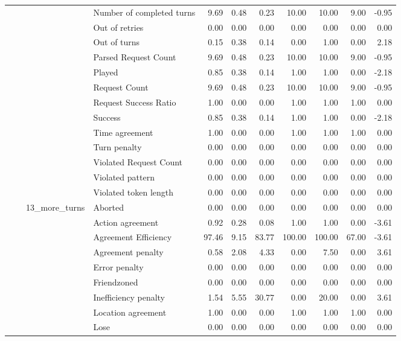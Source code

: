\begin{tabular}{llllrrrrrrr}
 &  &  & Number of completed turns & 9.69 & 0.48 & 0.23 & 10.00 & 10.00 & 9.00 & -0.95 \\
 &  &  & Out of retries & 0.00 & 0.00 & 0.00 & 0.00 & 0.00 & 0.00 & 0.00 \\
 &  &  & Out of turns & 0.15 & 0.38 & 0.14 & 0.00 & 1.00 & 0.00 & 2.18 \\
 &  &  & Parsed Request Count & 9.69 & 0.48 & 0.23 & 10.00 & 10.00 & 9.00 & -0.95 \\
 &  &  & Played & 0.85 & 0.38 & 0.14 & 1.00 & 1.00 & 0.00 & -2.18 \\
 &  &  & Request Count & 9.69 & 0.48 & 0.23 & 10.00 & 10.00 & 9.00 & -0.95 \\
 &  &  & Request Success Ratio & 1.00 & 0.00 & 0.00 & 1.00 & 1.00 & 1.00 & 0.00 \\
 &  &  & Success & 0.85 & 0.38 & 0.14 & 1.00 & 1.00 & 0.00 & -2.18 \\
 &  &  & Time agreement & 1.00 & 0.00 & 0.00 & 1.00 & 1.00 & 1.00 & 0.00 \\
 &  &  & Turn penalty & 0.00 & 0.00 & 0.00 & 0.00 & 0.00 & 0.00 & 0.00 \\
 &  &  & Violated Request Count & 0.00 & 0.00 & 0.00 & 0.00 & 0.00 & 0.00 & 0.00 \\
 &  &  & Violated pattern & 0.00 & 0.00 & 0.00 & 0.00 & 0.00 & 0.00 & 0.00 \\
 &  &  & Violated token length & 0.00 & 0.00 & 0.00 & 0.00 & 0.00 & 0.00 & 0.00 \\
\cline{3-11}
 &  & \multirow[t]{27}{*}{13_more_turns} & Aborted & 0.00 & 0.00 & 0.00 & 0.00 & 0.00 & 0.00 & 0.00 \\
 &  &  & Action agreement & 0.92 & 0.28 & 0.08 & 1.00 & 1.00 & 0.00 & -3.61 \\
 &  &  & Agreement Efficiency & 97.46 & 9.15 & 83.77 & 100.00 & 100.00 & 67.00 & -3.61 \\
 &  &  & Agreement penalty & 0.58 & 2.08 & 4.33 & 0.00 & 7.50 & 0.00 & 3.61 \\
 &  &  & Error penalty & 0.00 & 0.00 & 0.00 & 0.00 & 0.00 & 0.00 & 0.00 \\
 &  &  & Friendzoned & 0.00 & 0.00 & 0.00 & 0.00 & 0.00 & 0.00 & 0.00 \\
 &  &  & Inefficiency penalty & 1.54 & 5.55 & 30.77 & 0.00 & 20.00 & 0.00 & 3.61 \\
 &  &  & Location agreement & 1.00 & 0.00 & 0.00 & 1.00 & 1.00 & 1.00 & 0.00 \\
 &  &  & Lose & 0.00 & 0.00 & 0.00 & 0.00 & 0.00 & 0.00 & 0.00 \\

\end{tabular}
